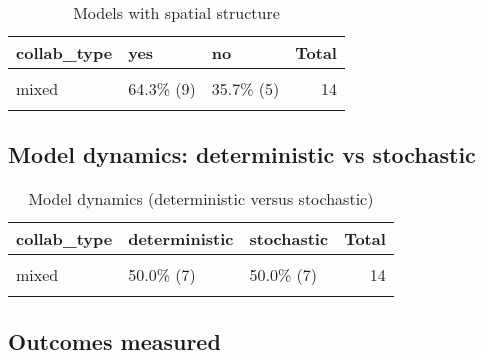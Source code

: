 \documentclass[
]{article}
\begin{document}
\begin{table}[H]

\caption{\label{tab:unnamed-chunk-53}Models with spatial structure}
\centering
\begin{tabular}[t]{lllr}
\toprule
collab\_type & yes & no & Total\\
\midrule
\cellcolor{gray!6}{purely\_academic} & \cellcolor{gray!6}{81.8\%  (9)} & \cellcolor{gray!6}{18.2\% (2)} & \cellcolor{gray!6}{11}\\
mixed & 64.3\%  (9) & 35.7\% (5) & 14\\
\cellcolor{gray!6}{Total} & \cellcolor{gray!6}{72.0\% (18)} & \cellcolor{gray!6}{28.0\% (7)} & \cellcolor{gray!6}{25}\\
\bottomrule
\end{tabular}
\end{table}

\hypertarget{model-dynamics-deterministic-vs-stochastic-1}{%
\subsection{Model dynamics: deterministic vs
stochastic}\label{model-dynamics-deterministic-vs-stochastic-1}}

\begin{table}[H]

\caption{\label{tab:unnamed-chunk-54}Model dynamics (deterministic versus stochastic)}
\centering
\begin{tabular}[t]{lllr}
\toprule
collab\_type & deterministic & stochastic & Total\\
\midrule
\cellcolor{gray!6}{purely\_academic} & \cellcolor{gray!6}{36.4\%  (4)} & \cellcolor{gray!6}{63.6\%  (7)} & \cellcolor{gray!6}{11}\\
mixed & 50.0\%  (7) & 50.0\%  (7) & 14\\
\cellcolor{gray!6}{Total} & \cellcolor{gray!6}{44.0\% (11)} & \cellcolor{gray!6}{56.0\% (14)} & \cellcolor{gray!6}{25}\\
\bottomrule
\end{tabular}
\end{table}

\hypertarget{outcomes-measured-1}{%
\subsection{Outcomes measured}\label{outcomes-measured-1}}
\end{document}
